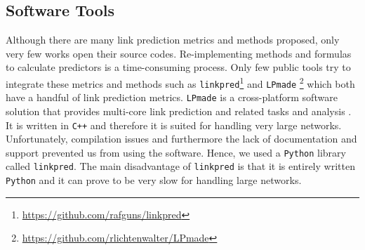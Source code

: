 \documentclass{acm_proc_article-sp}
\begin{document}

\subsection{Software Tools}
Although there are many link prediction metrics and methods proposed, only very few works open their source codes. Re-implementing methods and formulas to calculate predictors is a time-consuming process. Only few public tools try to integrate these metrics and methods such as \texttt{linkpred}\footnote{\url{https://github.com/rafguns/linkpred}} and \texttt{LPmade} \footnote{\url{https://github.com/rlichtenwalter/LPmade}} \cite{lichtenwalter2011lpmade} which both have a handful of link prediction metrics. \texttt{LPmade} is a cross-platform software solution that provides multi-core link prediction and related tasks and analysis \cite{lichtenwalter2011lpmade}. It is written in \texttt{C++} and therefore it is suited for handling very large networks. Unfortunately, compilation issues and furthermore the lack of documentation and support prevented us from using the software. Hence, we used a \texttt{Python} library called \texttt{linkpred}. The main disadvantage of \texttt{linkpred} is that it is entirely written \texttt{Python} and it can prove to be very slow for handling large networks.



\end{document}
